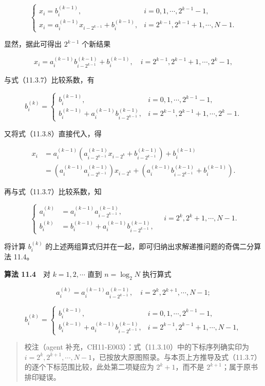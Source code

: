 \documentclass[
  10pt,
  fontset=fandol]{ctexart}
\begin{document}
\[
\begin{cases}
x_i=b_i^{(k-1)},& i=0,1,\cdots,2^{k-1}-1,\\
x_i=a_i^{(k-1)}x_{i-2^{k-1}}+b_i^{(k-1)},& i=2^{k-1},2^{k-1}+1,\cdots,N-1.
\end{cases}
\tag{11.3.8}
\]

显然，据此可得出 \(2^{k-1}\) 个新结果

\[
x_i=a_i^{(k-1)}b_{i-2^{k-1}}^{(k-1)}+b_i^{(k-1)},\quad i=2^{k-1},2^{k-1}+1,\cdots,2^k-1,
\]

与式（11.3.7）比较系数，有

\[
b_i^{(k)}=
\begin{cases}
b_i^{(k-1)},& i=0,1,\cdots,2^{k-1}-1,\\
b_i^{(k-1)}+a_i^{(k-1)}b_{i-2^{k-1}}^{(k-1)},& i=2^{k-1},2^{k-1}+1,\cdots,2^k-1.
\end{cases}
\tag{11.3.9}
\]

又将式（11.3.8）直接代入，得

\[
\begin{aligned}
x_i
&=a_i^{(k-1)}\left(a_{i-2^{k-1}}^{(k-1)}x_{i-2^k}+b_{i-2^{k-1}}^{(k-1)}\right)+b_i^{(k-1)}\\
&=\left(a_i^{(k-1)}a_{i-2^{k-1}}^{(k-1)}\right)x_{i-2^k}+\left(a_i^{(k-1)}b_{i-2^{k-1}}^{(k-1)}+b_i^{(k-1)}\right).
\end{aligned}
\]

再与式（11.3.7）比较系数，知

\[
\left\{
\begin{aligned}
a_i^{(k)}&=a_i^{(k-1)}a_{i-2^{k-1}}^{(k-1)},\\
b_i^{(k)}&=b_i^{(k-1)}+a_i^{(k-1)}b_{i-2^{k-1}}^{(k-1)},
\end{aligned}
\right.
\quad i=2^k,2^k+1,\cdots,N-1.
\]

将计算 \(b_i^{(k)}\) 的上述两组算式归并在一起，即可归纳出求解递推问题的奇偶二分算法 11.4。

\textbf{算法 11.4}　对 \(k=1,2,\cdots\) 直到 \(n=\log_2 N\) 执行算式

\[
a_i^{(k)}=a_i^{(k-1)}a_{i-2^{k-1}}^{(k-1)},\quad i=2^k,2^{k+1},\cdots,N-1;
\tag{11.3.10}
\]

\[
b_i^{(k)}=
\begin{cases}
b_i^{(k-1)},& i=0,1,\cdots,2^{k-1}-1,\\
b_i^{(k-1)}+a_i^{(k-1)}b_{i-2^{k-1}}^{(k-1)},& i=2^{k-1},2^{k-1}+1,\cdots,N-1,
\end{cases}
\tag{11.3.11}
\]

\begin{quote}
校注（agent 补充，CH11-E003）：式（11.3.10）中的下标序列确实印为 \(i=2^k,2^{k+1},\cdots,N-1\)，已按放大原图照录。与本页上方推导及式（11.3.7）的逐个下标范围比较，此处第二项疑应为 \(2^k+1\)，而不是 \(2^{k+1}\)；属于原书排印疑误。
\end{quote}
\end{document}
